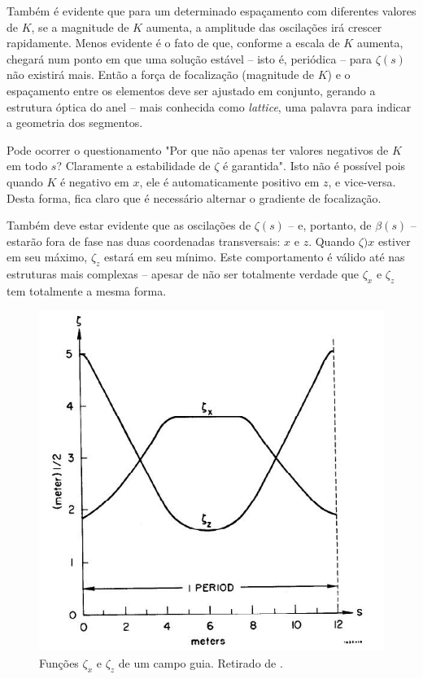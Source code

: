 Também é evidente que para um determinado espaçamento com diferentes valores de $K$, se a magnitude de $K$ aumenta, a amplitude das oscilações irá crescer rapidamente. Menos evidente é o fato de que, conforme a escala de $K$ aumenta, chegará num ponto em que uma solução estável -- isto é, periódica -- para $\zeta(s)$ não existirá mais. Então a força de focalização (magnitude de $K$) e o espaçamento entre os elementos deve ser ajustado em conjunto, gerando a estrutura óptica do anel -- mais conhecida como \textit{lattice}, uma palavra para indicar a geometria dos segmentos.

Pode ocorrer o questionamento "Por que não apenas ter valores negativos de $K$ em todo $s$? Claramente a estabilidade de $\zeta$ é garantida". Isto não é possível pois quando $K$ é negativo em $x$, ele é automaticamente positivo em $z$, e vice-versa. Desta forma, fica claro que é necessário alternar o gradiente de focalização.

Também deve estar evidente que as oscilações de $\zeta(s)$ -- e, portanto, de $\beta(s)$ -- estarão fora de fase nas duas coordenadas transversais: $x$ e $z$. Quando $\zeta)x$ estiver em seu máximo, $\zeta_z$ estará em seu mínimo. Este comportamento é válido até nas estruturas mais complexas -- apesar de não ser totalmente verdade que $\zeta_x$ e $\zeta_z$ tem totalmente a mesma forma. 

\begin{figure}[!htb]
	\centering
	\includegraphics[width=0.7\linewidth]{./Figuras/fig18.jpeg}
	\caption{Funções $\zeta_x$ e $\zeta_z$ de um campo guia. Retirado de \cite{sands1970physics}.}
	\label{fig:fig18}
\end{figure}

